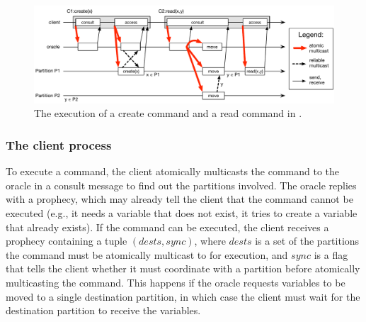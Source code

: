 \begin{figure}
\begin{minipage}[b]{1\linewidth} %
\centering
      \includegraphics[width=0.9\linewidth]{figures/dynastar}
\end{minipage}
\caption{The execution of a create command and a read command in \dynastar.}
\label{fig:oracle_repartition}
\end{figure}








\subsubsection{The client process} 

To execute a command, the client atomically multicasts the command to the oracle in a consult message to find out the partitions involved.
The oracle replies with a prophecy, which may already tell the client that the command cannot be executed (e.g., it needs a variable that does not exist, it tries to create a variable that already exists).
If the command can be executed, the client receives a prophecy containing a tuple $(dests, sync)$, where $dests$ is a set of the partitions the command must be atomically multicast to for execution, and $sync$ is a flag that tells the client whether it must coordinate with a partition before atomically multicasting the command.
This happens if the oracle requests variables to be moved to a single destination partition, in which case the client must wait for the destination partition to receive the variables.


